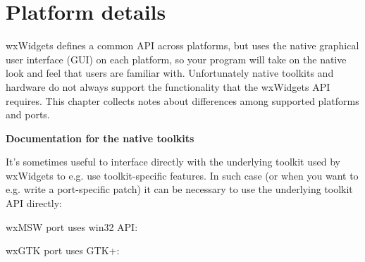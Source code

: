 \chapter{Platform details}\label{platformdetails}
%
\setfooter{\thepage}{}{}{}{}{\thepage}%

wxWidgets defines a common API across platforms, but uses the native graphical
user interface (GUI) on each platform, so your program will take on the native
look and feel that users are familiar with. Unfortunately native toolkits and
hardware do not always support the functionality that the wxWidgets API
requires. This chapter collects notes about differences among supported platforms and ports.











{\large {\bf Documentation for the native toolkits}}

It's sometimes useful to interface directly with the underlying toolkit
used by wxWidgets to e.g. use toolkit-specific features.
In such case (or when you want to e.g. write a port-specific patch) it can be
necessary to use the underlying toolkit API directly:

\begin{description}\itemsep=0pt
\item[{\bf wxMSW}]
wxMSW port uses win32 API: 

\item[{\bf wxGTK}]
wxGTK port uses GTK+: 

\end{description}

